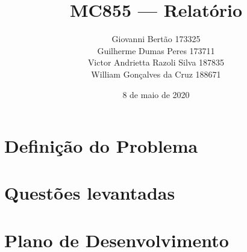 \documentclass[12pt, a4paper]{article}
\title{MC855 --- Relatório}
\author{Giovanni Bertão 173325\\
Guilherme Dumas Peres		173711\\ 
Victor Andrietta Razoli Silva		187835\\
William Gonçalves da Cruz		188671}
\date{8 de maio de 2020}
\begin{document}
\maketitle

\section{Definição do Problema}
\label{sec:def}


\section{Questões levantadas}
\label{sec:quests}


\section{Plano de Desenvolvimento}
\label{sec:plano}




\end{document}
